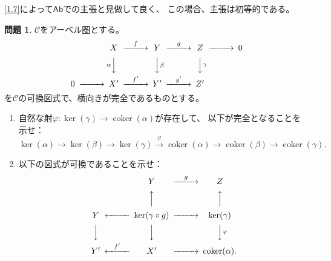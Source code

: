 \documentclass[uplatex,dvipdfmx]{jsarticle}
\makeatletter
\theoremstyle{definition}
\newtheorem{prob}[prob]{問題}
\renewenvironment{proof}[1][\proofname]{
  \pushQED{\qed}%
  \normalfont \topsep6\p@\@plus6\p@\relax
  \trivlist
  \item[\hskip\labelsep
    #1\@addpunct{\textbf{.}}]\ignorespaces
}{%
  \popQED\endtrivlist\@endpefalse
}
\providecommand{\proofname}{証明}
\DeclareMathOperator{\coker}{\mathrm{coker}}
\newcommand{\Ab}{\mathsf{Ab}}
\newcommand\mcC{\mathcal{C}}
\makeatother
\begin{document}
\begin{proof}
  \autoref{1.7}によって\(\Ab\)での主張と見做して良く、
  この場合、主張は初等的である。
\end{proof}




\begin{prob}\label{1.9}
  \(\mcC\)をアーベル圏とする。
  \[
  \begin{CD}
    @. X @> f >> Y @> g >> Z @>>> 0 \\
    @. @V \alpha VV @VV \beta V @VV \gamma V \\
    0 @>>> X' @> f' >> Y' @> g' >> Z' @.
  \end{CD}
  \]
  を\(\mcC\)の可換図式で、横向きが完全であるものとする。
  \begin{enumerate}
    \item \label{1.9.1}
    自然な射\(\varphi:\ker(\gamma) \to \coker(\alpha)\)が存在して、
    以下が完全となることを示せ：
    \[
    \ker(\alpha) \to \ker(\beta) \to \ker(\gamma) \xrightarrow{\varphi}
    \coker(\alpha) \to \coker(\beta) \to \coker(\gamma).
    \]
    \item \label{1.9.2}
    以下の図式が可換であることを示せ：
    \[
    \begin{CD}
      @. Y @> g >> Z \\
      @. @AAA @AAA \\
      Y @<<< \ker(\gamma\circ g) @>>> \ker(\gamma) \\
      @VVV @VVV @VV \varphi V \\
      Y' @< f' << X' @>>> \coker(\alpha).
    \end{CD}
    \]
  \end{enumerate}
\end{prob}
\end{document}

